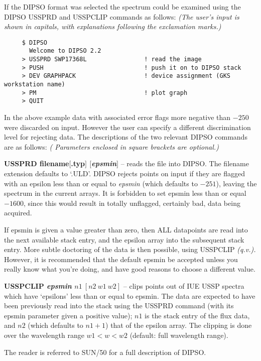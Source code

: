 If the DIPSO format was selected the spectrum could be examined using
the DIPSO USSPRD and USSPCLIP commands as follows: {\sl (The user's input is
shown in capitals, with explanations following the exclamation marks.)}
\begin{verbatim}
     $ DIPSO
       Welcome to DIPSO 2.2
     > USSPRD SWP17368L                ! read the image
     > PUSH                            ! push it on to DIPSO stack
     > DEV GRAPHPACK                   ! device assignment (GKS workstation name)
     > PM                              ! plot graph
     > QUIT
\end{verbatim}
In the above example data with associated error flags more negative than $-250$
were discarded on input.
However the user can specify a different discrimination level for rejecting
data.
The descriptions of the two relevant DIPSO commands are as follows:
{\sl( Parameters enclosed in square brackets are optional.)}
\begin{description}
\item{\bf USSPRD filename$[$.typ$]$ $[${\it epsmin}$]$} --
reads the file into DIPSO. The filename extension defaults to `.ULD'.
DIPSO rejects points on input if they are flagged with an epsilon less than or
equal to {\it epsmin} (which defaults to $-251$), leaving the spectrum in
the current arrays.
It is forbidden to set epsmin less than or equal $-1600$, since this would
result in totally unflagged, certainly bad, data being acquired.

If epsmin is given a value greater than zero, then ALL datapoints are
read into the next available stack entry, and the epsilon array into
the subsequent stack entry.   More subtle doctoring of the data is then
possible, using USSPCLIP {\it(q.v.).}   However, it is recommended that the
default epsmin be accepted unless you really know what you're doing,
and have good reasons to choose a different value.

\item{\bf USSPCLIP {\it epsmin} $n1\ [n2\ w1\ w2]$} --
clips points out of IUE USSP spectra which have `epsilons' less than
or equal to epsmin.
The data are expected to have been previously read into the stack
using the USSPRD command (with its epsmin parameter given a positive
value);
$n1$ is the stack entry of the flux data, and $n2$ (which defaults
to $n1+1$) that of the epsilon array.
The clipping is done over the wavelength range $w1<w<w2$ (default:
full wavelength range).

\end{description}

The reader  is referred to SUN/50 for a full description of DIPSO.



